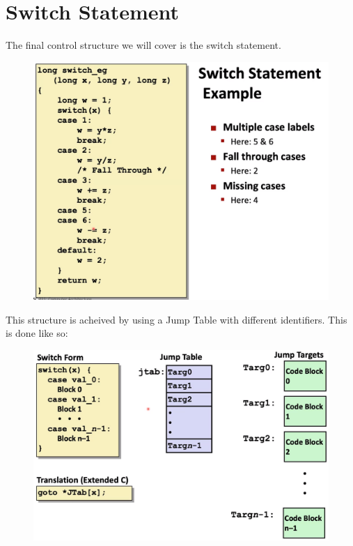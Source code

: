 \documentclass[12pt]{book}
\begin{document}
\section*{Switch Statement}
The final control structure we will cover is the switch statement.

\begin{figure}[h]
        \centering
        \includegraphics[scale = 0.3]{./figures/switch}
\end{figure}

This structure is acheived by using a Jump Table with different identifiers. This is done like so:
\begin{figure}
        \centering
        \includegraphics[scale = 0.4]{./figures/jumpTable}
\end{figure}
\end{document}
